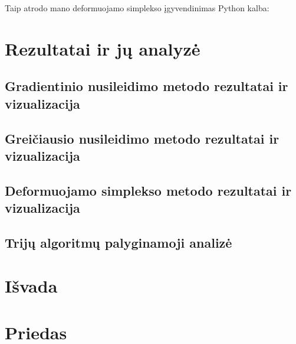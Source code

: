 \documentclass{article}
\begin{document}
Taip atrodo mano deformuojamo simplekso įgyvendinimas Python kalba:
\section{Rezultatai ir jų analyzė}
\subsection{Gradientinio nusileidimo metodo rezultatai ir vizualizacija}
\subsection{Greičiausio nusileidimo metodo rezultatai ir vizualizacija}
\subsection{Deformuojamo simplekso metodo rezultatai ir vizualizacija}
\subsection{Trijų algoritmų palyginamoji analizė}
\section{Išvada}
\section{Priedas}
\end{document}
